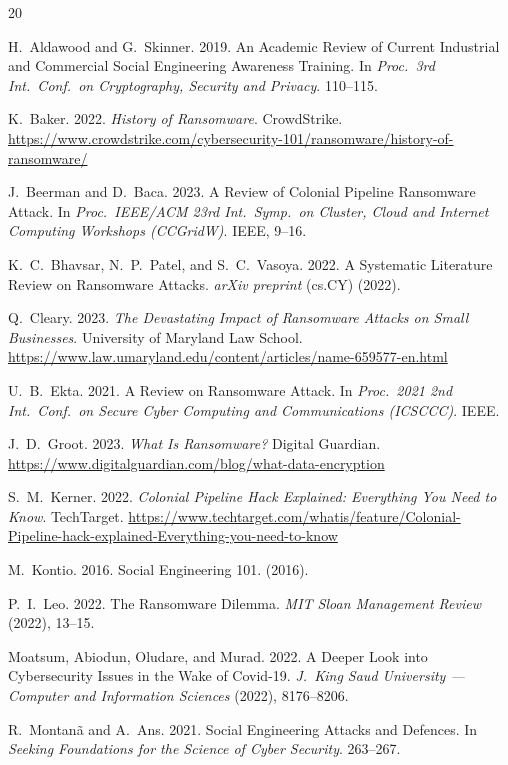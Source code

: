 \documentclass[sigconf,nonacm]{acmart}
\begin{document}
\sloppy

\begin{thebibliography}{20}

H.~Aldawood and G.~Skinner. 2019. An Academic Review of Current Industrial and
Commercial Social Engineering Awareness Training. In \textit{Proc.\ 3rd Int.\ Conf.\ on
Cryptography, Security and Privacy}. 110--115.

K.~Baker. 2022. \textit{History of Ransomware}. CrowdStrike.
\url{https://www.crowdstrike.com/cybersecurity-101/ransomware/history-of-ransomware/}

J.~Beerman and D.~Baca. 2023. A Review of Colonial Pipeline Ransomware Attack. In
\textit{Proc.\ IEEE/ACM 23rd Int.\ Symp.\ on Cluster, Cloud and Internet Computing
Workshops (CCGridW)}. IEEE, 9--16.

K.~C.~Bhavsar, N.~P.~Patel, and S.~C.~Vasoya. 2022. A Systematic Literature Review on
Ransomware Attacks. \textit{arXiv preprint} (cs.CY) (2022).

Q.~Cleary. 2023. \textit{The Devastating Impact of Ransomware Attacks on Small
Businesses}. University of Maryland Law School.
\url{https://www.law.umaryland.edu/content/articles/name-659577-en.html}

U.~B.~Ekta. 2021. A Review on Ransomware Attack. In \textit{Proc.\ 2021 2nd Int.\
Conf.\ on Secure Cyber Computing and Communications (ICSCCC)}. IEEE.

J.~D.~Groot. 2023. \textit{What Is Ransomware?} Digital Guardian.
\url{https://www.digitalguardian.com/blog/what-data-encryption}

S.~M.~Kerner. 2022. \textit{Colonial Pipeline Hack Explained: Everything You Need to
Know}. TechTarget. \url{https://www.techtarget.com/whatis/feature/Colonial-Pipeline-hack-explained-Everything-you-need-to-know}

M.~Kontio. 2016. Social Engineering 101. (2016).

P.~I.~Leo. 2022. The Ransomware Dilemma. \textit{MIT Sloan Management Review} (2022),
13--15.

Moatsum, Abiodun, Oludare, and Murad. 2022. A Deeper Look into Cybersecurity Issues in
the Wake of Covid-19. \textit{J.\ King Saud University --- Computer and Information
Sciences} (2022), 8176--8206.

R.~Montan\~{a} and A.~Ans. 2021. Social Engineering Attacks and Defences. In
\textit{Seeking Foundations for the Science of Cyber Security}. 263--267.


\end{thebibliography}
\end{document}
